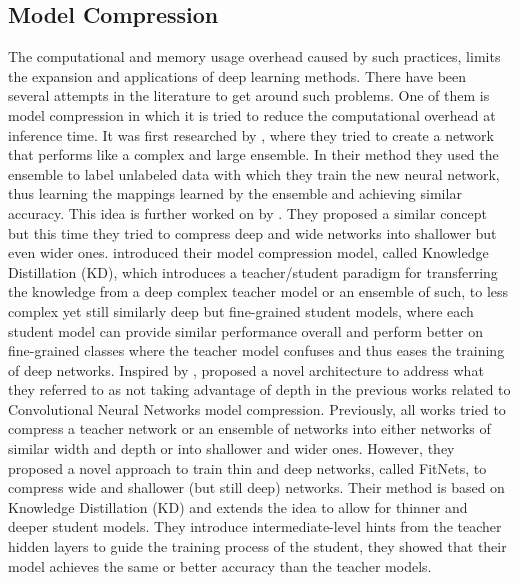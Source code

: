 \documentclass{article} \usepackage{lets_keepit_simple,times}
\begin{document}
\subsection{Model Compression}
The computational and memory usage overhead caused by such practices, limits the expansion and applications of deep learning methods. There have been several attempts in the literature to get around such problems. One of them is model compression in which it is tried to reduce the computational overhead at inference time. It was first researched by \cite{Bucilua_Model_compression_2006}, where they tried to create a network that performs like a complex and large ensemble. In their method they used the ensemble to label unlabeled data with which they train the new neural network, thus learning the mappings learned by the ensemble and achieving similar accuracy. This idea is further worked on by \cite{Ba_DoDeepNets_nd_B_Deep_2014}. They proposed a similar concept but this time they tried to compress deep and wide networks into shallower but even wider ones. \cite{Hinton_Distillation_2015} introduced their model compression model, called Knowledge Distillation (KD), which introduces a teacher/student paradigm for transferring the knowledge from a deep complex teacher model or an ensemble of such, to less complex yet still similarly deep but fine-grained student models, where each student model can provide similar performance overall and perform better on fine-grained classes where the teacher model confuses and thus eases the training of deep networks. Inspired by \cite{Hinton_Distillation_2015}, \cite{Romero_Fitnet_2014} proposed a novel architecture to address what they referred to as not taking advantage of depth in the previous works related to Convolutional Neural Networks model compression. Previously, all works tried to compress a teacher network or an ensemble of networks into either networks of similar width and depth or into shallower and wider ones. However, they proposed a novel approach to train thin and deep networks, called FitNets, to compress wide and shallower (but still deep) networks. Their method is based on Knowledge Distillation (KD)\cite{Hinton_Distillation_2015} and extends the idea to allow for thinner and deeper student models. They introduce intermediate-level hints from the teacher hidden layers to guide the training process of the student, they showed that their model achieves the same or better accuracy than the teacher models.
\end{document}
